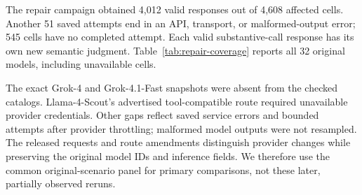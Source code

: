 The repair campaign obtained 4,012 valid responses out of 4,608 affected cells. Another 51 saved attempts end in an API, transport, or malformed-output error; 545 cells have no completed attempt. Each valid substantive-call response has its own new semantic judgment. Table~\ref{tab:repair-coverage} reports all 32 original models, including unavailable cells.

The exact Grok-4 and Grok-4.1-Fast snapshots were absent from the checked catalogs. Llama-4-Scout's advertised tool-compatible route required unavailable provider credentials. Other gaps reflect saved service errors and bounded attempts after provider throttling; malformed model outputs were not resampled. The released requests and route amendments distinguish provider changes while preserving the original model IDs and inference fields. We therefore use the common original-scenario panel for primary comparisons, not these later, partially observed reruns.

